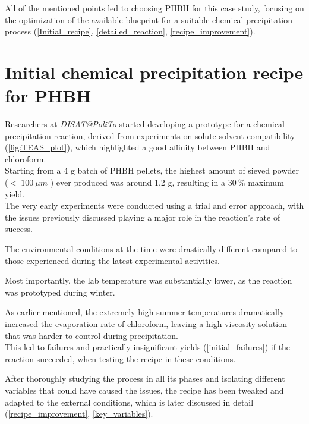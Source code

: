 \documentclass{article}
\begin{document}
    All of the mentioned points led to choosing PHBH for this case study, focusing on the optimization of 
    the available blueprint for a suitable chemical 
    precipitation process (\ref{Initial_recipe}, \ref{detailed_reaction}, \ref{recipe_improvement}). 

    \clearpage
    \section{Initial chemical precipitation recipe for PHBH\label{Initial_recipe}}
    
    Researchers at \textit{DISAT@PoliTo} started developing a prototype for a chemical precipitation reaction, 
    derived from experiments on solute-solvent compatibility (\ref{fig:TEAS_plot}), 
    which highlighted a good affinity between PHBH and chloroform. \\ 

    Starting from a 4 g batch of PHBH pellets, the highest amount of sieved powder ($ < \ 100 \ \mu m$ )
    ever produced was around 1.2 g, resulting in a $30 \ \% $ maximum yield. \\ 

    The very early experiments were conducted using a trial and error approach, with the issues previously discussed 
    playing a major role in the reaction's rate of success. 
    
    The environmental conditions at the time were drastically different compared to those experienced during the latest experimental 
    activities. 

    Most importantly, the lab temperature was substantially lower, as the reaction was prototyped during winter. 
    
    As earlier mentioned, the extremely high summer temperatures dramatically increased the evaporation rate of 
    chloroform, leaving a high viscosity solution that was harder to control during precipitation. \\

    This led to failures and practically insignificant yields (\ref{initial_failures}) if 
    the reaction succeeded, when testing the recipe in these conditions.  

    After thoroughly studying the process in all its phases and isolating different variables that could have caused the issues, 
    the recipe has been tweaked and adapted to the external conditions, which is later discussed 
    in detail (\ref{recipe_improvement}, \ref{key_variables}). 
\end{document}
